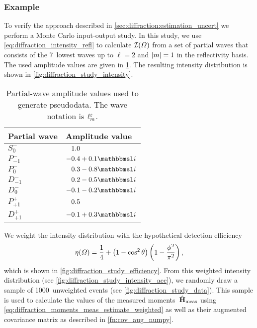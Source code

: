\subsubsection{Example}%
\label{sec:diffraction:example}

To verify the approach described in
\cref{sec:diffraction:estimation_uncert} we perform a Monte Carlo
input-output study.  In this study, we use
\cref{eq:diffraction_intensity_refl} to calculate
$\mathcal{I}(\Omega)$ from a set of partial waves that consists of the
7~lowest waves up to $\ell = 2$ and $\vert{m}\vert = 1$ in the reflectivity
basis.  The used amplitude values are given in
\cref{tab:diffraction_study_waveset}.  The resulting intensity
distribution is shown in \cref{fig:diffraction_study_intensity}.

\begin{table}[tbp]
  \centering%
  \renewcommand{\arraystretch}{1.2}%
  \caption{Partial-wave amplitude values used to generate pseudodata.
  The wave notation is $\ell_m^\varepsilon$.}%
  \label{tab:diffraction_study_waveset}%
  \vspace*{1ex}%
  \begin{tabular}{ll}
    \toprule
    \textbf{Partial wave} &
    \textbf{Amplitude value} \\
    \midrule
    $S_0^-$    & $\hphantom{-}1.0$ \\
    $P_{-1}^-$ & $-0.4 + 0.1 \imag$ \\
    $P_0^-$    & $\hphantom{-}0.3 - 0.8 \imag$ \\
    $D_{-1}^-$ & $\hphantom{-}0.2 - 0.5 \imag$ \\
    $D_0^-$    & $-0.1 - 0.2 \imag$ \\
    \midrule
    $P_{+1}^+$ & $\hphantom{-}0.5$ \\
    $D_{+1}^+$ & $-0.1 + 0.3 \imag$ \\
    \bottomrule
  \end{tabular}
\end{table}

We weight the intensity distribution with the hypothetical detection
efficiency
\begin{equation}
  \label{eq:diffraction_study_acc1}
  \eta(\Omega)
  = \frac{1}{4} + \rBrk[1]{1 - \cos^2 \theta} \rBrk[3]{1 - \frac{\phi^2}{\pi^2}},
\end{equation}
which is shown in \cref{fig:diffraction_study_efficiency}.  From this
weighted intensity distribution (see
\cref{fig:diffraction_study_intensity_acc}), we randomly draw a sample
of \num{1000}~unweighted events (see \cref{fig:diffraction_study_data}).  This
sample is used to calculate the values of the measured
moments~$\hat{\bm{\mathrm{H}}}_\text{meas}$ using
\cref{eq:diffraction_moments_meas_estimate_weighted} as well as their augmented
covariance matrix as described in \cref{fn:cov_aug_numpy}.

